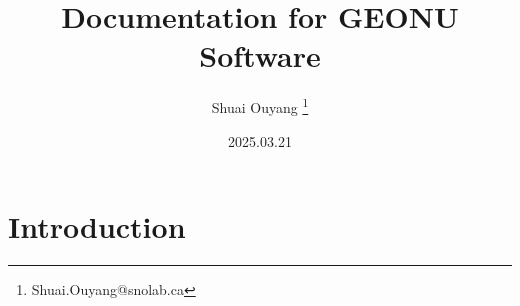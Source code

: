 
\usepackage{ctex}

\title{\textbf{Documentation for GEONU Software}}
\author{Shuai Ouyang \thanks{Shuai.Ouyang@snolab.ca}}
\date{2025.03.21}


	\maketitle							%
	\thispagestyle{empty}				%
	\frontmatter						%
	\cleardoublepage				 	%
	\tableofcontents				  	%
	\mainmatter							%
	\chapter{Introduction}
